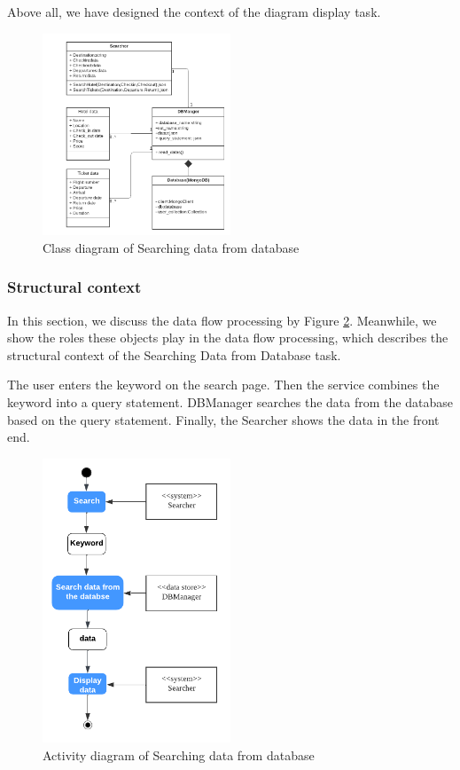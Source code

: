 \documentclass[conference]{IEEEtran}
\begin{document}
Above all, we have designed the context of the diagram display task.
\begin{figure}[htbp]
	\centerline{\includegraphics[width=0.5\textwidth]{image/searching hotel class1.pdf}}
	\caption{Class diagram of Searching data from database }
	\label{class1}
\end{figure}

\subsubsection{\textbf{Structural context }}

\textbf{}

In this section, we discuss the data flow processing by Figure \ref{activity1}. Meanwhile, we show the roles these objects play in the data flow processing, which describes the structural context of the Searching Data from Database task.

The user enters the keyword on the search page. Then the service combines the keyword into a query statement. DBManager searches the data from the database based on the query statement. Finally, the Searcher shows the data in the front end.
\begin{figure}[htbp]
	\centerline{\includegraphics[width=0.5\textwidth]{image/searching hotel activity1.pdf}}
	\caption{Activity diagram of Searching data from database }
	\label{activity1}
\end{figure}
\end{document}
